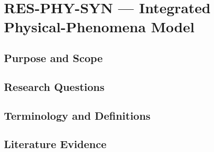
\section{RES-PHY-SYN --- Integrated Physical-Phenomena Model}
\label{sec:res-phy-syn}

\subsection{Purpose and Scope}
\label{sec:res-phy-syn-purpose}


\subsection{Research Questions}
\label{sec:res-phy-syn-research-questions}


\subsection{Terminology and Definitions}
\label{sec:res-phy-syn-definitions}


\subsection{Literature Evidence}
\label{sec:res-phy-syn-literature-evidence}

%

